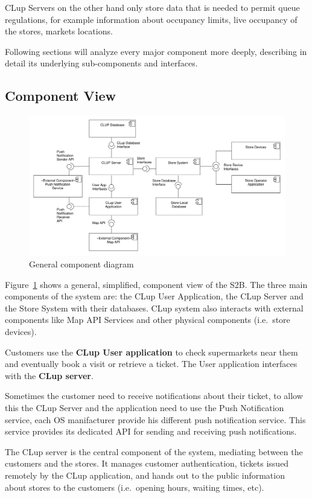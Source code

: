 CLup Servers on the other hand only store data that is needed to permit queue regulations, for example information about occupancy limits, live occupancy of the stores, markets locations.

Following sections will analyze every major component more deeply, describing in detail its underlying sub-components and interfaces.  

\subsection{Component View}
\begin{figure}[H]
    \includegraphics[width=\textwidth]{Images/UML_general_component.pdf}
    \caption{\label{fig:UML_comp_general}General component diagram}
\end{figure}
Figure~\ref{fig:UML_comp_general} shows a general, simplified, component view of the S2B.
The three main components of the system are: the CLup User Application, the CLup Server and the Store System with their databases. CLup system also interacts with external components like Map API Services and other physical components (i.e.~store devices).

Customers use the \textbf{CLup User application} to check supermarkets near them and eventually book a visit or retrieve a ticket. The User application interfaces with the \textbf{CLup server}. 

Sometimes the customer need to receive notifications about their ticket, to allow this the CLup Server and the application need to use the Push Notification service, each OS manifacturer provide his different push notification service. This service provides its dedicated API for sending and receiving push notifications.

The CLup server is the central component of the system, mediating between the customers and the stores. It manages customer authentication, tickets issued remotely by the CLup application, and hands out to the public information about stores to the customers (i.e.~opening hours, waiting times, etc). 

